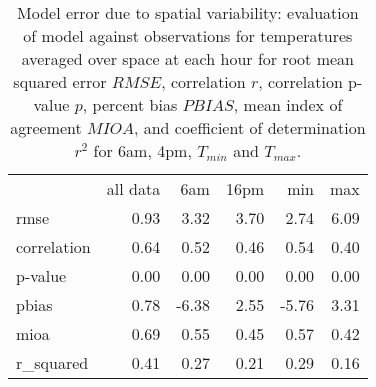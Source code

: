 \documentclass[draft,linenumbers]{agujournal}
\begin{document}
\begin{table}
\centering
\begin{tabular}{lrrrrr}
{} &  all data &     6am &   16pm &   min &  max \\
rmse        &      0.93 &  3.32 & 3.70 &  2.74 & 6.09 \\
correlation &      0.64 &  0.52 & 0.46 &  0.54 & 0.40 \\
p-value     &      0.00 &  0.00 & 0.00 &  0.00 & 0.00 \\
pbias       &      0.78 & -6.38 & 2.55 & -5.76 & 3.31 \\
mioa        &      0.69 &  0.55 & 0.45 &  0.57 & 0.42 \\
r\_squared   &      0.41 &  0.27 & 0.21 &  0.29 & 0.16 \\
\end{tabular}


\caption{Model error due to spatial variability: evaluation of model against observations for temperatures averaged over space at each hour for root mean squared error $RMSE$, correlation  $r$, correlation p-value $p$, percent bias $PBIAS$, mean index of agreement $MIOA$, and coefficient of determination $r^2$ for 6am, 4pm, $T_{min}$ and $T_{max}$.  }
\label{tab:space_error}
\end{table}
\end{document}

